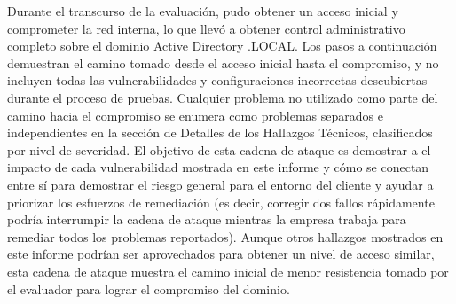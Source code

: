 \qquad Durante el transcurso de la evaluación, \brandName pudo obtener un acceso inicial y comprometer la red interna, lo que llevó a obtener control administrativo completo sobre el dominio Active Directory \enterpriseName.LOCAL. Los pasos a continuación demuestran el camino tomado desde el acceso inicial hasta el compromiso, y no incluyen todas las vulnerabilidades y configuraciones incorrectas descubiertas durante el proceso de pruebas. Cualquier problema no utilizado como parte del camino hacia el compromiso se enumera como problemas separados e independientes en la sección de Detalles de los Hallazgos Técnicos, clasificados por nivel de severidad. El objetivo de esta cadena de ataque es demostrar a \enterpriseName el impacto de cada vulnerabilidad mostrada en este informe y cómo se conectan entre sí para demostrar el riesgo general para el entorno del cliente y ayudar a priorizar los esfuerzos de remediación (es decir, corregir dos fallos rápidamente podría interrumpir la cadena de ataque mientras la empresa trabaja para remediar todos los problemas reportados). Aunque otros hallazgos mostrados en este informe podrían ser aprovechados para obtener un nivel de acceso similar, esta cadena de ataque muestra el camino inicial de menor resistencia tomado por el evaluador para lograr el compromiso del dominio.
